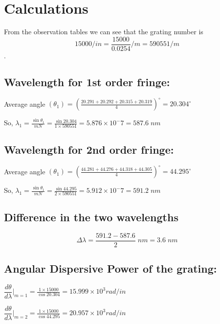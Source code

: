 \section{Calculations}

	From the observation tables we can see that the grating number is $$15000/in = \frac{15000}{0.0254}/m = 590551/m$$.
	
	\vspace{-1cm}
	\subsection{Wavelength for 1st order fringe:}
		Average angle $(\theta_1) = (\frac{20.291+20.292+20.315+20.319}{4})^\circ = 20.304^\circ$
	
		\vspace{3mm}
		So, $\lambda_{1} = \frac{\sin\theta_1}{mN} = \frac{\sin20.304}{1 \times 590551} = 5.876 \times 10^-7 = 587.6 \; nm$

	\subsection{Wavelength for 2nd order fringe:}
		Average angle $(\theta_1) = (\frac{44.281+44.276+44.318+44.305}{4})^\circ = 44.295^\circ$
	
		\vspace{3mm}
		So, $\lambda_{1} = \frac{\sin\theta_1}{mN} = \frac{\sin44.295}{2 \times 590551} = 5.912 \times 10^-7 = 591.2 \; nm$

	\subsection{Difference in the two wavelengths}
		$$\Delta\lambda = \frac{591.2-587.6}{2} \; nm = 3.6 \; nm$$

	\subsection{Angular Dispersive Power of the grating:}
		$\dfrac{d \theta}{d \lambda} \bigg|_{m=1} = \frac{1 \times 15000}{\cos20.304} = 15.999 \times 10^3 rad / in$

		\vspace{5mm}
		$\dfrac{d \theta}{d \lambda} \bigg|_{m=2} = \frac{1 \times 15000}{\cos44.295} = 20.957 \times 10^3 rad / in$
